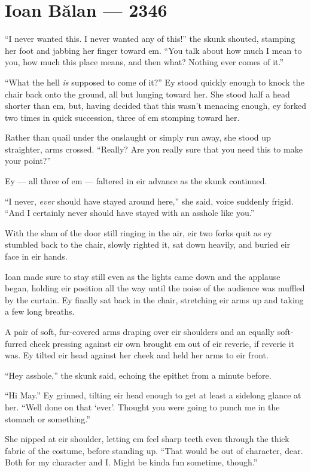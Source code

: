 \hypertarget{ioan-bux103lan-2346}{%
\chapter{Ioan Bălan — 2346}\label{ioan-bux103lan-2346}}

``I never wanted this. I never wanted any of this!'' the skunk shouted, stamping her foot and jabbing her finger toward em. ``You talk about how much I mean to you, how much this place means, and then what? Nothing ever comes of it.''

``What the hell \emph{is} supposed to come of it?'' Ey stood quickly enough to knock the chair back onto the ground, all but lunging toward her. She stood half a head shorter than em, but, having decided that this wasn't menacing enough, ey forked two times in quick succession, three of em stomping toward her.

Rather than quail under the onslaught or simply run away, she stood up straighter, arms crossed. ``Really? Are you really sure that you need this to make your point?''

Ey — all three of em — faltered in eir advance as the skunk continued.

``I never, \emph{ever} should have stayed around here,'' she said, voice suddenly frigid. ``And I certainly never should have stayed with an asshole like you.''

With the slam of the door still ringing in the air, eir two forks quit as ey stumbled back to the chair, slowly righted it, sat down heavily, and buried eir face in eir hands.

Ioan made sure to stay still even as the lights came down and the applause began, holding eir position all the way until the noise of the audience was muffled by the curtain. Ey finally sat back in the chair, stretching eir arms up and taking a few long breaths.

A pair of soft, fur-covered arms draping over eir shoulders and an equally soft-furred cheek pressing against eir own brought em out of eir reverie, if reverie it was. Ey tilted eir head against her cheek and held her arms to eir front.

``Hey asshole,'' the skunk said, echoing the epithet from a minute before.

``Hi May.'' Ey grinned, tilting eir head enough to get at least a sidelong glance at her. ``Well done on that `ever'. Thought you were going to punch me in the stomach or something.''

She nipped at eir shoulder, letting em feel sharp teeth even through the thick fabric of the costume, before standing up. ``That would be out of character, dear. Both for my character and I. Might be kinda fun sometime, though.''

